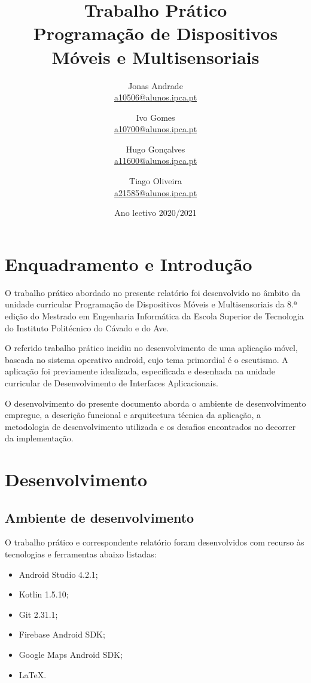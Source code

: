 \documentclass[12pt]{report}
\title{\textbf{Trabalho Prático \\
			   Programação de Dispositivos Móveis e Multisensoriais}
			   \vspace{0.5cm}}
\author{
  Jonas Andrade \\
  \href{mailto:a10506@alunos.ipca.pt}{a10506@alunos.ipca.pt}
  \and
  Ivo Gomes \\
  \href{mailto:a10700@alunos.ipca.pt}{a10700@alunos.ipca.pt}
  \and
  Hugo Gonçalves \\
  \href{mailto:a11600@alunos.ipca.pt}{a11600@alunos.ipca.pt}
  \and
  Tiago Oliveira \\
  \href{mailto:a21585@alunos.ipca.pt}{a21585@alunos.ipca.pt}
  \vspace{1cm}
}
\affil{
    \normalfont Mestrado em Engenharia Informática \\
	\normalfont Escola Superior de Tecnologia \\
    \normalfont Instituto Politécnico do Cávado e do Ave
    \vspace{1cm}
}
\date{Ano lectivo 2020/2021}
\begin{document}
\maketitle

\tableofcontents

\listoffigures
{}

\printnoidxglossary[sort=standard]

\clearpage

\chapter{Enquadramento e Introdução}

O trabalho prático abordado no presente relatório foi desenvolvido no âmbito da unidade curricular Programação de Dispositivos Móveis e Multisensoriais da 8.ª edição do Mestrado em Engenharia Informática da Escola Superior de Tecnologia do Instituto Politécnico do Cávado e do Ave.

O referido trabalho prático incidiu no desenvolvimento de uma aplicação móvel, baseada no sistema operativo \gls{android}, cujo tema primordial é o escutismo. A aplicação foi previamente idealizada, especificada e desenhada na unidade curricular de Desenvolvimento de Interfaces Aplicacionais.

O desenvolvimento do presente documento aborda o ambiente de desenvolvimento empregue, a descrição funcional e arquitectura técnica da aplicação, a metodologia de desenvolvimento utilizada e os desafios encontrados no decorrer da implementação.

\clearpage

\chapter{Desenvolvimento}

\section{Ambiente de desenvolvimento}

O trabalho prático e correspondente relatório foram desenvolvidos com recurso às tecnologias e ferramentas abaixo listadas:

\begin{itemize}
    \item Android Studio 4.2.1;
    \item Kotlin 1.5.10;
    \item Git 2.31.1;
    \item Firebase Android SDK;
    \item Google Maps Android SDK;
    \item \LaTeX.
\end{itemize}
\end{document}
